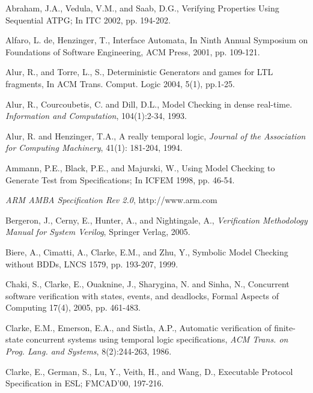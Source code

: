 \documentclass[a4paper, 11pt]{article}
\begin{document}
\newpage
{\footnotesize
\begin{thebibliography}{99}

  Abraham, J.A., Vedula, V.M., and
          Saab, D.G., Verifying Properties Using Sequential
          ATPG; In ITC 2002, pp. 194-202.

  Alfaro, L. de, Henzinger, T., 
          Interface Automata, In Ninth Annual Symposium on Foundations 
	  of Software Engineering, ACM Press, 2001, pp. 109-121.

 Alur, R., and Torre, L., S., Deterministic 
	Generators and games for LTL fragments, In ACM Trans. Comput. 
	Logic 2004, 5(1), pp.1-25.

 Alur, R., Courcoubetis, C. and Dill, D.L.,
        Model Checking in dense real-time.
        {\em Information and Computation}, 104(1):2-34, 1993.

 Alur, R. and Henzinger, T.A.,
         A really temporal logic,
         {\em Journal of the Association for Computing Machinery}, 41(1):
         181-204, 1994.

 Ammann, P.E., Black, P.E., and Majurski, W.,
        Using Model Checking to Generate Test from Specifications; In
        ICFEM 1998, pp. 46-54.

 {\em ARM AMBA Specification Rev 2.0}, http://www.arm.com 

 Bergeron, J., Cerny, E., Hunter, A., and
    Nightingale, A., {\em Verification Methodology Manual for System
    Verilog}, Springer Verlag, 2005.

 Biere, A., Cimatti, A.,  Clarke, E.M., and Zhu, Y.,
    Symbolic Model Checking without BDDs, LNCS 1579, pp. 193-207, 1999. 

 Chaki, S., Clarke, E., Ouaknine, J., Sharygina, N.
    and Sinha, N.,
    Concurrent software verification with states, events, and deadlocks,
    Formal Aspects of Computing 17(4), 2005, pp. 461-483.

  Clarke, E.M., Emerson, E.A., and Sistla, A.P., Automatic
        verification of finite-state concurrent systems using temporal logic
        specifications, {\em ACM Trans. on Prog. Lang. and Systems},
        8(2):244-263, 1986. 

 Clarke, E., German, S., Lu, Y., Veith, H., and Wang, D.,
        Executable Protocol Specification in ESL;
        FMCAD'00, 197-216. 


\end{thebibliography}}
\end{document}
